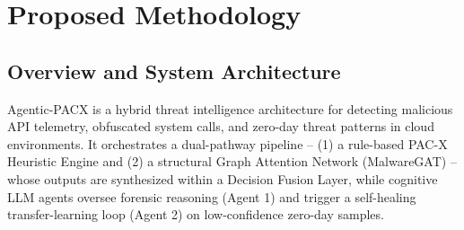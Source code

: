 \documentclass[conference]{IEEEtran}
\begin{document}
\section{Proposed Methodology}

\subsection{Overview and System Architecture}
Agentic-PACX is a hybrid threat intelligence architecture for detecting malicious API telemetry, obfuscated system calls, and zero-day threat patterns in cloud environments. It orchestrates a dual-pathway pipeline -- (1) a rule-based PAC-X Heuristic Engine and (2) a structural Graph Attention Network (MalwareGAT) -- whose outputs are synthesized within a Decision Fusion Layer, while cognitive LLM agents oversee forensic reasoning (Agent 1) and trigger a self-healing transfer-learning loop (Agent 2) on low-confidence zero-day samples.
\end{document}
